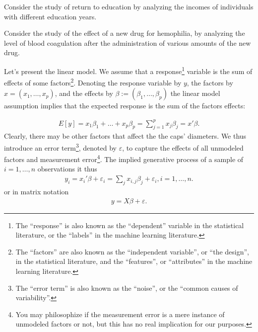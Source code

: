 \documentclass[]{book}
\theoremstyle{definition}
\theoremstyle{definition}
\theoremstyle{definition}
\theoremstyle{remark}
\let\BeginKnitrBlock\begin \let\EndKnitrBlock\end
\begin{document}
\BeginKnitrBlock{example}[Return to Education]
\protect\hypertarget{exm:unnamed-chunk-147}{}{\label{exm:unnamed-chunk-147} {} }Consider the study of return to education by analyzing the incomes of individuals with different education years.
\EndKnitrBlock{example}

\BeginKnitrBlock{example}[Drug Effect]
\protect\hypertarget{exm:unnamed-chunk-148}{}{\label{exm:unnamed-chunk-148} {} }Consider the study of the effect of a new drug for hemophilia, by analyzing the level of blood coagulation after the administration of various amounts of the new drug.
\EndKnitrBlock{example}

Let's present the linear model.
We assume that a response\footnote{The ``response'' is also known as the ``dependent'' variable in the statistical literature, or the ``labels'' in the machine learning literature.} variable is the sum of effects of some factors\footnote{The ``factors'' are also known as the ``independent variable'', or ``the design'', in the statistical literature, and the ``features'', or ``attributes'' in the machine learning literature.}.
Denoting the response variable by \(y\), the factors by \(x=(x_1,\dots,x_p)\), and the effects by \(\beta:=(\beta_1,\dots,\beta_p)\) the linear model assumption implies that the expected response is the sum of the factors effects:

\begin{align}
  E[y]=x_1 \beta_1 + \dots + x_p \beta_p = \sum_{j=1}^p x_j \beta_j = x'\beta .
  \label{eq:linear-mean}
\end{align}
Clearly, there may be other factors that affect the the caps' diameters.
We thus introduce an error term\footnote{The ``error term'' is also known as the ``noise'', or the ``common causes of variability''.}, denoted by \(\varepsilon\), to capture the effects of all unmodeled factors and measurement error\footnote{You may philosophize if the measurement error is a mere instance of unmodeled factors or not, but this has no real implication for our purposes.}.
The implied generative process of a sample of \(i=1,\dots,n\) observations it thus
\begin{align}
  y_i = x_i'\beta + \varepsilon_i = \sum_j x_{i,j} \beta_j + \varepsilon_i , i=1,\dots,n .
  \label{eq:linear-observed}
\end{align}
or in matrix notation
\begin{align}
  y = X \beta + \varepsilon .
  \label{eq:linear-matrix}
\end{align}
\end{document}
